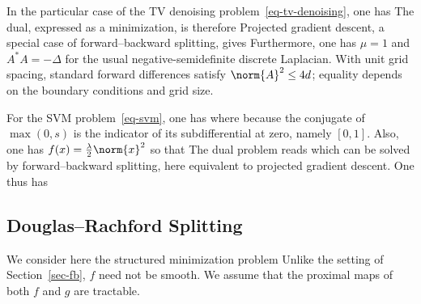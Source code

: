 \begin{exmp}[TV denoising]
In the particular case of the TV denoising problem~\eqref{eq-tv-denoising}, one has
The dual, expressed as a minimization, is therefore
Projected gradient descent, a special case of forward--backward splitting, gives
Furthermore, one has $\mu=1$ and $A^*A=-\Delta$ for the usual negative-semidefinite discrete Laplacian. With unit grid spacing, standard forward differences satisfy $\norm{A}^2\leq4d$; equality depends on the boundary conditions and grid size.
\end{exmp}


\begin{exmp}
	For the SVM problem~\eqref{eq-svm}, one has 
	where 
	because the conjugate of $\max(0,s)$ is the indicator of its subdifferential at zero, namely $[0,1]$.
	Also, one has $f(x) = \frac{\lambda}{2}\norm{x}^2$
	so that 
	The dual problem reads
	which can be solved by forward--backward splitting, here equivalent to projected gradient descent.
	One thus has 
\end{exmp}



\subsection{Douglas--Rachford Splitting}
\label{sec-dr}

We consider here the structured minimization problem
Unlike the setting of Section~\ref{sec-fb}, $f$ need not be smooth. We assume that the proximal maps of both $f$ and $g$ are tractable.


